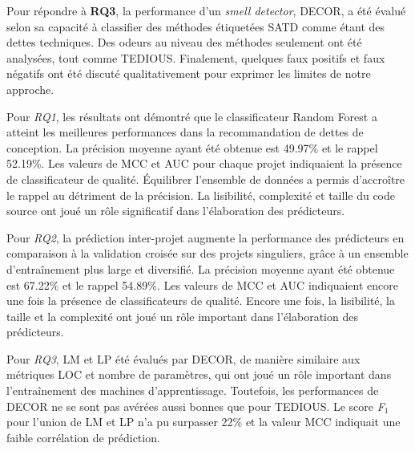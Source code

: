 Pour r\'{e}pondre \`{a} \textbf{RQ3}, la performance d'un \emph{smell detector}, \ac{DECOR}, a \'{e}t\'{e} \'{e}valu\'{e} selon sa capacit\'{e} \`{a} classifier des m\'{e}thodes \'{e}tiquet\'{e}es \ac{SATD} comme \'{e}tant des dettes techniques. Des odeurs au niveau des m\'{e}thodes seulement ont \'{e}t\'{e} analys\'{e}es, tout comme \ac{TEDIOUS}. Finalement, quelques faux positifs et faux n\'{e}gatifs ont \'{e}t\'{e} discut\'{e} qualitativement pour exprimer les limites de notre approche. \par

Pour \emph{RQ1}, les r\'{e}sultats ont d\'{e}montr\'{e} que le classificateur Random Forest a atteint les meilleures performances dans la recommandation de dettes de conception. La pr\'{e}cision moyenne ayant \'{e}t\'{e} obtenue est 49.97\% et le rappel 52.19\%. Les valeurs de \ac{MCC} et \ac{AUC} pour chaque projet indiquaient la pr\'{e}sence de classificateur de qualit\'{e}. \'{E}quilibrer l'ensemble de donn\'{e}es a permis d'accro\^{i}tre le rappel au d\'{e}triment de la pr\'{e}cision. La lisibilit\'{e}, complexit\'{e} et taille du code source ont jou\'{e} un r\^{o}le significatif dans l'\'{e}laboration des pr\'{e}dicteurs. \par

Pour \emph{RQ2}, la pr\'{e}diction inter-projet augmente la performance des pr\'{e}dicteurs en comparaison \`{a} la validation crois\'{e}e sur des projets singuliers, gr\^{a}ce \`{a} un ensemble d'entra\^{i}nement plus large et diversifi\'{e}. La pr\'{e}cision moyenne ayant \'{e}t\'{e} obtenue est 67.22\% et le rappel 54.89\%. Les valeurs de \ac{MCC} et \ac{AUC} indiquaient encore une fois la pr\'{e}sence de classificateurs de qualit\'{e}. Encore une fois, la lisibilit\'{e}, la taille et la complexit\'{e} ont jou\'{e} un r\^{o}le important dans l'\'{e}laboration des pr\'{e}dicteurs. \par

Pour \emph{RQ3}, \ac{LM} et \ac{LP} \'{e}t\'{e} \'{e}valu\'{e}s par \ac{DECOR}, de mani\`{e}re similaire aux m\'{e}triques \ac{LOC} et nombre de param\`{e}tres, qui ont jou\'{e} un r\^{o}le important dans l'entra\^{i}nement des machines d'apprentissage. Toutefois, les performances de \ac{DECOR} ne se sont pas av\'{e}r\'{e}es aussi bonnes que pour \ac{TEDIOUS}. Le score \emph{F$_{1}$} pour l'union de \ac{LM} et \ac{LP} n'a pu surpasser 22\% et la valeur \ac{MCC} indiquait une faible corr\'{e}lation de pr\'{e}diction. \par

